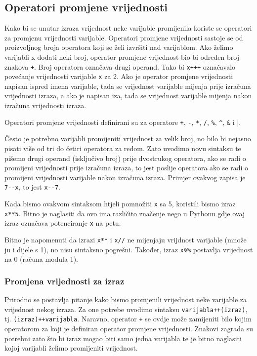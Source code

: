 \documentclass[times, utf8, zavrsni]{fer}
\begin{document}
\subsection{Operatori promjene vrijednosti}
Kako bi se unutar izraza vrijednost neke varijable promijenila koriste se operatori za promjenu vrijednosti varijable. Operatori promjene vrijednosti sastoje se od proizvoljnog
broja operatora koji se želi izvršiti nad varijablom. Ako želimo varijabli x dodati neki broj, operator promjene vrijednost bio bi određen broj znakova \verb|+|. Broj operatora
označava drugi operand. Tako bi \verb|x+++| označavalo povećanje vrijednosti varijable \verb|x| za 2. Ako je operator promjene vrijednosti napisan ispred imena varijable,
tada se vrijednost varijable mijenja prije izračuna vrijednosti izraza, a ako je napisan iza, tada se vrijednost varijable mijenja nakon izračuna vrijednosti izraza.

Operatori promjene vrijednosti definirani su za operatore \verb|+|, \verb|-|, \verb|*|, \verb|/|, \verb|%|, \verb|^|, \verb|&| i \verb|||.

Često je potrebno varijabli promijeniti vrijednost za velik broj, no bilo bi nejasno pisati više od tri do četiri operatora za redom. Zato uvodimo novu sintaksu
te pišemo drugi operand (isključivo broj) prije dvostrukog operatora, ako se radi o promijeni vrijednosti prije izračuna izraza, to jest poslije operatora ako se radi o promijeni
vrijednosti varijable nakon izračuna izraza. Primjer ovakvog zapisa je \verb|7--x|, to jest \verb|x--7|.

Kada bismo ovakvom sintaksom htjeli pomnožiti \verb|x| sa 5, koristili bismo izraz \verb|x**5|. Bitno je naglasiti da ovo ima različito značenje nego u Pythonu gdje 
ovaj izraz označava potenciranje \verb|x| na petu.

Bitno je napomenuti da izrazi \verb|x**| i \verb|x//| ne mijenjaju vrijdnost varijable (množe ju i dijele s 1), no nisu sintaksno pogrešni. Također, izraz
\verb|x%%| postavlja vrijednost na 0 (računa modula 1).

\subsubsection{Promjena vrijednosti za izraz}
Prirodno se postavlja pitanje kako bismo promjenili vrijednost neke varijable za vrijednost nekog izraza. Za one potrebe uvodimo sintaksu \verb|varijabla++(izraz)|,
tj. \verb|(izraz)++varijabla|. Naravno, operator \verb|+| se ovdje može zamijeniti bilo kojim operatorom za koji je definiran operator promjene vrijednosti.
Znakovi zagrada su potrebni zato što bi izraz mogao biti samo jedna varijabla te je bitno naglasiti kojoj varijabli želimo promijeniti vrijednost.
\end{document}
